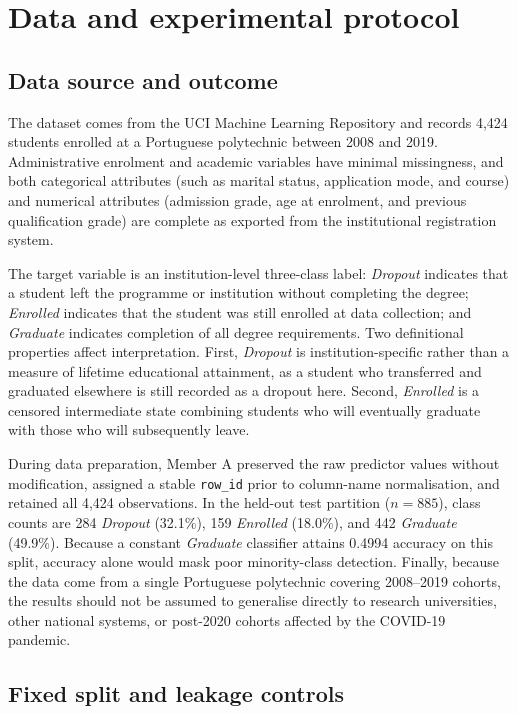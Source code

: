 \documentclass[11pt,a4paper]{article}
\newcommand{\Dropout}{\textit{Dropout}}
\newcommand{\Enrolled}{\textit{Enrolled}}
\newcommand{\Graduate}{\textit{Graduate}}
\begin{document}
\section{Data and experimental protocol}

\subsection{Data source and outcome}

The dataset comes from the UCI Machine Learning Repository \citep{realinho2021} and records 4,424
students enrolled at a Portuguese polytechnic between 2008 and 2019. Administrative enrolment and
academic variables have minimal missingness, and both categorical attributes (such as marital
status, application mode, and course) and numerical attributes (admission grade, age at enrolment,
and previous qualification grade) are complete as exported from the institutional registration
system.

The target variable is an institution-level three-class label: \Dropout{} indicates that a student
left the programme or institution without completing the degree; \Enrolled{} indicates that the
student was still enrolled at data collection; and \Graduate{} indicates completion of all degree
requirements. Two definitional properties affect interpretation. First, \Dropout{} is
institution-specific rather than a measure of lifetime educational attainment, as a student who
transferred and graduated elsewhere is still recorded as a dropout here. Second, \Enrolled{} is a
censored intermediate state combining students who will eventually graduate with those who will
subsequently leave.

During data preparation, Member A preserved the raw predictor values without modification, assigned
a stable \texttt{row\_id} prior to column-name normalisation, and retained all 4,424 observations.
In the held-out test partition ($n = 885$), class counts are 284 \Dropout{} (32.1\%), 159
\Enrolled{} (18.0\%), and 442 \Graduate{} (49.9\%). Because a constant \Graduate{} classifier
attains 0.4994 accuracy on this split, accuracy alone would mask poor minority-class detection.
Finally, because the data come from a single Portuguese polytechnic covering 2008--2019 cohorts,
the results should not be assumed to generalise directly to research universities, other national
systems, or post-2020 cohorts affected by the COVID-19 pandemic.

\subsection{Fixed split and leakage controls}
\end{document}
